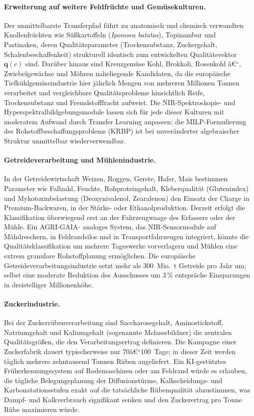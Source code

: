\documentclass[a4paper, 12pt, twoside, openright]{report}
\theoremstyle{definition}
\theoremstyle{definition}
\begin{document}
\paragraph{Erweiterung auf weitere Feldfrüchte und Gemüsekulturen.}
Der unmittelbarste Transferpfad führt zu anatomisch und chemisch verwandten
Knollenfrüchten wie Süßkartoffeln (\textit{Ipomoea batatas}), Topinambur
und Pastinaken, deren Qualitätsparameter (Trockensubstanz, Zuckergehalt,
Schalenbeschaffenheit) strukturell identisch zum entwickelten Qualitätsvektor
$\mathbf{q}(c)$ sind. Darüber hinaus sind Kreuzgemüse Kohl, Brokkoli,
Rosenkohl â€“, Zwiebelgewächse und Möhren naheliegende Kandidaten, da die
europäische Tiefkühlgemüseindustrie hier jährlich Mengen von mehreren
Millionen Tonnen verarbeitet und vergleichbare Qualitätsprobleme hinsichtlich
Reife, Trockensubstanz und Fremdstofffracht aufweist. Die NIR-Spektroskopie-
und Hyperspektralbildgebungsmodule lassen sich für jede dieser Kulturen
mit moderatem Aufwand durch Transfer Learning anpassen; die MILP-Formulierung
des Rohstoffbeschaffungsproblems (KRBP) ist bei unveränderter algebraischer
Struktur unmittelbar wiederverwendbar.

\paragraph{Getreideverarbeitung und Mühlenindustrie.}
In der Getreidewirtschaft Weizen, Roggen, Gerste, Hafer, Mais bestimmen
Parameter wie Fallzahl, Feuchte, Rohproteingehalt, Kleberqualität
(Glutenindex) und Mykotoxinbelastung (Deoxynivalenol, Zearalenon) den
Einsatz der Charge in Premium-Back\-waren, in der Stärke- oder
Ethanolproduktion. Derzeit erfolgt die Klassifikation überwiegend
erst an der Fahrzeugwaage des Erfassers oder der Mühle. Ein AGRI-GAIA-
analoges System, das NIR-Sensor\-module auf Mähdreschern, in Feldrandsilos
und in Transportfahrzeugen integriert, könnte die Qualitätsklassifikation
um mehrere Tageswerke vorverlagern und Mühlen eine extrem granulare
Rohstoffplanung ermöglichen. Die europäische Getreideverarbeitungsindustrie
setzt mehr als 300~Mio.~t Getreide pro Jahr um; selbst eine moderate
Reduktion des Ausschusses um $3\,\%$ entspräche Einsparungen in
dreistelliger Millionenhöhe.

\paragraph{Zuckerindustrie.}
Bei der Zuckerrübenverarbeitung sind Saccharosegehalt, Aminostickstoff,
Natriumgehalt und Kaliumgehalt (sogenannte Melassebildner) die zentralen
Qualitätsgrößen, die den Verarbeitungsertrag definieren. Die Kampagne einer
Zuckerfabrik dauert typischerweise nur 70â€“100~Tage; in dieser Zeit werden
täglich mehrere zehntausend Tonnen Rüben angeliefert. Ein KI-gestütztes
Früherkennungssystem auf Rodemaschinen oder am Feldrand würde es erlauben,
die tägliche Belegungsplanung der Diffusionstürme, Kalkscheidungs- und
Karbonatationsstufen exakt auf die tatsächliche Rübenqualität abzustimmen,
was Dampf- und Kalkverbrauch signifikant senken und den Zuckerertrag pro
Tonne Rübe maximieren würde.
\end{document}
